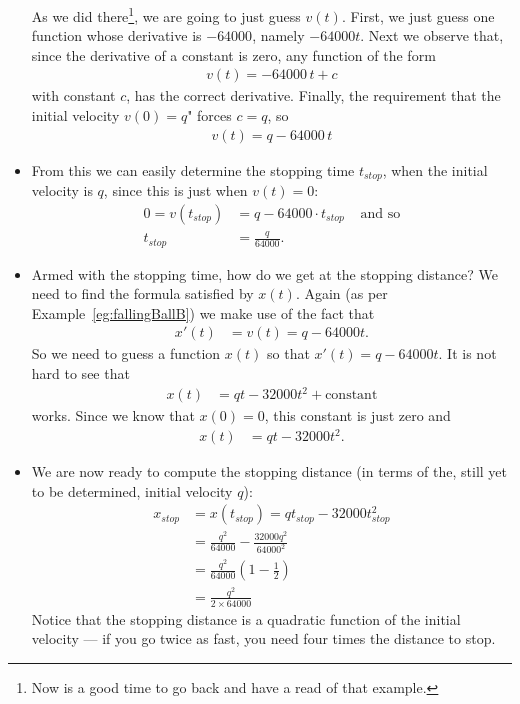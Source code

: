 \begin{eg}
\begin{itemize}
As we did there\footnote{Now is a good time to go back and have a read of that example.},
we are going to just guess $v(t)$. First, we just guess one function whose derivative is
$-64000$, namely $-64000 t$. Next we observe that, since the derivative of a constant is
zero, any function of the form
\begin{align*}
  v(t) = -64000\,t + c
\end{align*}
with constant $c$, has the correct derivative. Finally, the requirement that the initial
velocity $v(0)=q$" forces $c=q$, so
\begin{align*}
  v(t) = q - 64000\,t
\end{align*}

\item From this we can easily determine the stopping time $t_{stop}$, when the initial
velocity is $q$, since this is just when $v(t) = 0$:
\begin{align*}
  0 = v(t_{stop}) &= q-64000 \cdot t_{stop} & \text{ and so}\\
  t_{stop} &= \frac{q}{64000}.
\end{align*}
\item Armed with the stopping time, how do we get at the stopping distance?  We need to
find the formula satisfied by $x(t)$. Again (as per Example~\ref{eg:fallingBallB}) we
make use of the fact that
\begin{align*}
x'(t) &= v(t) = q - 64000t.
\end{align*}
So we need to guess a function $x(t)$ so that $x'(t) = q-64000 t$. It is not hard to see
that
\begin{align*}
  x(t) &= qt - 32000t^2 + \text{constant}
\end{align*}
works. Since we know that $x(0)=0$, this constant is just zero and
\begin{align*}
  x(t) &= qt - 32000 t^2.
\end{align*}

\item We are now ready to compute the stopping distance (in terms of the, still yet to be
determined, initial velocity $q$):
\begin{align*}
  x_{stop} &= x(t_{stop}) = q t_{stop} - 32000 t_{stop}^2 \\
  &= \frac{q^2}{64000} - \frac{32000 q^2}{64000^2} \\
  &= \frac{q^2}{64000} \left(1 - \frac{1}{2} \right) \\
  &= \frac{q^2}{2 \times 64000}
\end{align*}
Notice that the stopping distance is a quadratic function of the initial velocity --- if
you go twice as fast, you need four times the distance to stop.


\end{itemize}
\end{eg}
